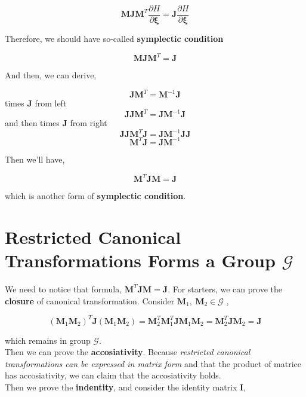 \documentclass[12pt]{article}
\numberwithin{equation}{section}
\begin{document}
\begin{equation}
    \pmb{MJM}^T \frac{\partial H}{\partial \pmb{\xi}} = \pmb{J}\frac{\partial H}{\partial \pmb{\xi}}
\end{equation}

Therefore, we should have so-called \textbf{symplectic condition}

\begin{equation}
    \pmb{MJM}^T = \pmb{J}
\end{equation}

And then, we can derive,

\begin{center}
    \[ \pmb{JM}^{T} = \pmb{M}^{-1}\pmb{J}\]
    times $\pmb{J}$ from left
    \[ \pmb{J}\pmb{JM}^T = \pmb{JM}^{-1}\pmb{J} \]
    and then times $\pmb{J}$ from right
    \[ \pmb{JJM}^T\pmb{J} = \pmb{JM}^{-1}\pmb{JJ}\]
    \[ \pmb{M}^T\pmb{J} = \pmb{JM}^{-1}\]
\end{center}

Then we'll have,

\begin{equation}
    \pmb{M}^T\pmb{JM} = \pmb{J}
\end{equation}

which is another form of \textbf{symplectic condition}.

\section{Restricted Canonical Transformations Forms a Group $\mathcal{G}$}

We need to notice that formula, $\mathbf{M}^T\mathbf{JM} = \mathbf{J}$. For starters, we can prove the \textbf{closure} of canonical transformation. Consider $\mathbf{M}_1,\ \mathbf{M}_2 \in \mathcal{G}$ ,

\begin{equation}
    \left(\mathbf{M}_1\mathbf{M}_2\right)^T \mathbf{J}\left(\mathbf{M}_1\mathbf{M}_2\right) = \mathbf{M}_2^T\mathbf{M}_1^T\mathbf{J}\mathbf{M}_1\mathbf{M}_2 = \mathbf{M}_2^T\mathbf{J}\mathbf{M}_2 = \mathbf{J}
\end{equation}

which remains in group $\mathcal{G}$.
\\
\indent Then we can prove the \textbf{accosiativity}. Because \textit{restricted canonical transformations can be expressed in matrix form} and that the product of matrice has accosiativity, we can claim that the accosiativity holds.
\\
\indent Then we prove the \textbf{indentity}, and consider the identity matrix $\mathbf{I}$,
\end{document}
